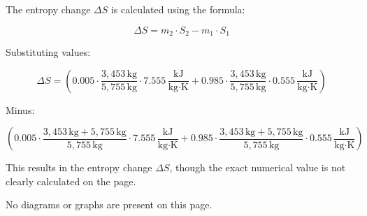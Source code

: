 The entropy change \( \Delta S \) is calculated using the formula:  

\[
\Delta S = m_2 \cdot S_2 - m_1 \cdot S_1
\]

Substituting values:  

\[
\Delta S = \left( 0.005 \cdot \frac{3,453 \, \text{kg}}{5,755 \, \text{kg}} \cdot 7.555 \, \frac{\text{kJ}}{\text{kg·K}} + 0.985 \cdot \frac{3,453 \, \text{kg}}{5,755 \, \text{kg}} \cdot 0.555 \, \frac{\text{kJ}}{\text{kg·K}} \right)
\]

Minus:  

\[
\left( 0.005 \cdot \frac{3,453 \, \text{kg} + 5,755 \, \text{kg}}{5,755 \, \text{kg}} \cdot 7.555 \, \frac{\text{kJ}}{\text{kg·K}} + 0.985 \cdot \frac{3,453 \, \text{kg} + 5,755 \, \text{kg}}{5,755 \, \text{kg}} \cdot 0.555 \, \frac{\text{kJ}}{\text{kg·K}} \right)
\]

This results in the entropy change \( \Delta S \), though the exact numerical value is not clearly calculated on the page.  

No diagrams or graphs are present on this page.